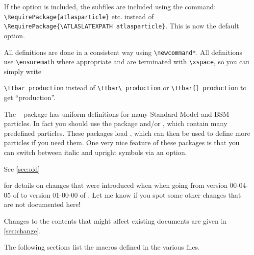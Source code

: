 If the  option  is included, the subfiles are included using the command:
\verb|\RequirePackage{atlasparticle}| etc. instead of \verb|\RequirePackage{\ATLASLATEXPATH atlasparticle}|.
 This is now the default option.

All definitions are done in a consistent way using \verb|\newcommand*|.
All definitions use \verb|\ensuremath| where appropriate and are terminated with
\verb|\xspace|, so you can simply write {\verb|\ttbar production| instead of
\verb|\ttbar\ production| or \verb|\ttbar{} production| to get \enquote{\ttbar production}.

The ~\cite{hepparticles} package has uniform definitions for many Standard Model and BSM particles.
In fact you should use the package  and/or ,
which contain many predefined particles.
These packages load , which can then be used to define more particles if you need them.
One very nice feature of these packages is that you can switch between italic and upright symbols via an option.

See \cref{sec:old}} for details on changes that were introduced when
when going from version 00-04-05 of 
to version 01-00-00 of .
Let me know if you spot some other changes that are not documented here!

Changes to the contents that might affect existing documents are given in \cref{sec:change}.

The following sections list the macros defined in the various files.

